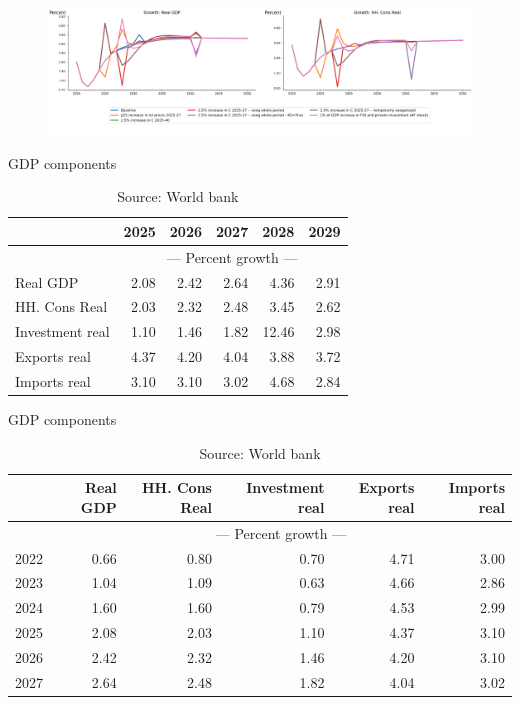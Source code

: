 \documentclass{article}
\begin{document}
 
\begin{figure}[htbp]
\centering
\includegraphics[width=\textwidth]{"../My_first_plot/My_first_plot.png"}
\caption{}
\end{figure} 
\begin{table}[ht]
\caption{GDP components}
\begin{tabular}{lrrrrr}
\toprule
 & 2025 & 2026 & 2027 & 2028 & 2029 \\
\midrule
&\multicolumn{5}{c}{{--- Percent growth ---}}                          \\
Real GDP & 2.08 & 2.42 & 2.64 & 4.36 & 2.91 \\
HH. Cons Real & 2.03 & 2.32 & 2.48 & 3.45 & 2.62 \\
Investment real & 1.10 & 1.46 & 1.82 & 12.46 & 2.98 \\
Exports real & 4.37 & 4.20 & 4.04 & 3.88 & 3.72 \\
Imports real & 3.10 & 3.10 & 3.02 & 4.68 & 2.84 \\
\bottomrule
\end{tabular}
\caption*{Source: World bank }
\end{table}

\begin{table}[ht]
\caption{GDP components}
\begin{tabular}{lrrrrr}
\toprule
 & Real GDP & HH. Cons Real & Investment real & Exports real & Imports real \\
\midrule
&\multicolumn{5}{c}{{--- Percent growth ---}}\\
2022 & 0.66 & 0.80 & 0.70 & 4.71 & 3.00 \\
2023 & 1.04 & 1.09 & 0.63 & 4.66 & 2.86 \\
2024 & 1.60 & 1.60 & 0.79 & 4.53 & 2.99 \\
2025 & 2.08 & 2.03 & 1.10 & 4.37 & 3.10 \\
2026 & 2.42 & 2.32 & 1.46 & 4.20 & 3.10 \\
2027 & 2.64 & 2.48 & 1.82 & 4.04 & 3.02 \\
\bottomrule
\end{tabular}
\caption*{Source: World bank }
\end{table}
\end{document}
